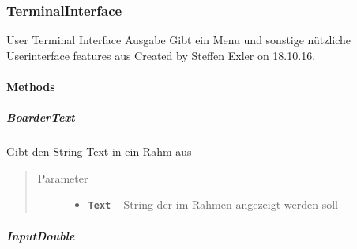 \documentclass[letterpaper,10pt,ngerman]{sphinxmanual}
\begin{document}
\subsubsection{TerminalInterface}
\label{com/linuxluigi/polynomial/TerminalInterface:terminalinterface}\label{com/linuxluigi/polynomial/TerminalInterface::doc}

\begin{fulllineitems}
\label{com/linuxluigi/polynomial/TerminalInterface:com.linuxluigi.polynomial.TerminalInterface}
User Terminal Interface Ausgabe Gibt ein Menu und sonstige nützliche Userinterface features aus Created by Steffen Exler on 18.10.16.

\end{fulllineitems}



\paragraph{Methods}
\label{com/linuxluigi/polynomial/TerminalInterface:methods}

\subparagraph{BoarderText}
\label{com/linuxluigi/polynomial/TerminalInterface:boardertext}

\begin{fulllineitems}
\label{com/linuxluigi/polynomial/TerminalInterface:com.linuxluigi.polynomial.TerminalInterface.BoarderText(String)}
Gibt den String Text in ein Rahm aus
\begin{quote}\begin{description}
\item[{Parameter}] \leavevmode\begin{itemize}
\item {} 
\textbf{\texttt{Text}} -- String der im Rahmen angezeigt werden soll

\end{itemize}

\end{description}\end{quote}

\end{fulllineitems}



\subparagraph{InputDouble}
\label{com/linuxluigi/polynomial/TerminalInterface:inputdouble}
\end{document}
